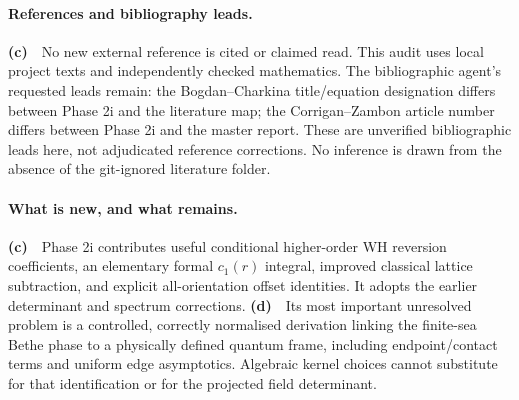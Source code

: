 \documentclass[11pt,a4paper]{article}
\newcommand{\Lc}{\textbf{(c)}\ }
\newcommand{\Ld}{\textbf{(d)}\ }
\begin{document}
\paragraph{References and bibliography leads.}
\Lc\ No new external reference is cited or claimed read. This audit uses
local project texts and independently checked mathematics. The bibliographic
agent's requested leads remain: the Bogdan--Charkina title/equation designation
differs between Phase 2i and the literature map; the Corrigan--Zambon article
number differs between Phase 2i and the master report. These are unverified
bibliographic leads here, not adjudicated reference corrections. No inference
is drawn from the absence of the git-ignored literature folder.

\paragraph{What is new, and what remains.}
\Lc\ Phase 2i contributes useful conditional higher-order WH reversion
coefficients, an elementary formal $c_1(r)$ integral, improved classical
lattice subtraction, and explicit all-orientation offset identities.
It adopts the earlier determinant and spectrum corrections. \Ld\ Its most
important unresolved problem is a controlled, correctly normalised derivation
linking the finite-sea Bethe phase to a physically defined quantum frame,
including endpoint/contact terms and uniform edge asymptotics. Algebraic
kernel choices cannot substitute for that identification or for the projected
field determinant.
\end{document}
